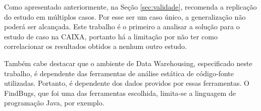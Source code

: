 Como apresentado anteriormente, na Seção \ref{sec:validade},  recomenda a replicação do estudo em múltiplos casos. Por esse ser um caso único, a generalização não poderá ser alcançada. Este trabalho é o primeiro a analisar a solução para o estudo de caso na CAIXA, portanto há a limitação por não  ter como correlacionar os resultados obtidos a nenhum outro estudo.

Também cabe destacar que o ambiente de Data Warehousing, especificado neste trabalho, é dependente das ferramentas de análise estática de código-fonte utilizadas. Portanto, é dependente dos dados providos por essas ferramentas. O FindBugs, que foi uma das ferramentas escolhida, limita-se a linguagem de programação Java, por exemplo.




